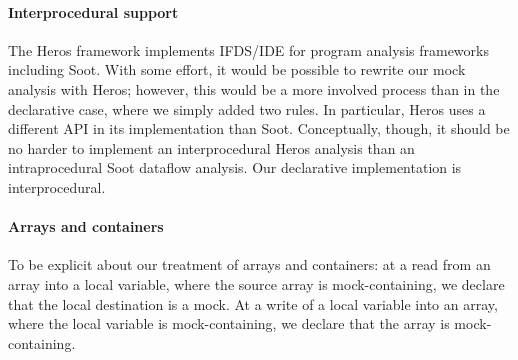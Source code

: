 

\paragraph{Interprocedural support} The Heros framework\cite{bodden12:_inter_proced_data_flow_analy} implements IFDS/IDE for program analysis frameworks including Soot. With some effort, it would be possible to rewrite our mock analysis with Heros; however, this would be a more involved process than in the declarative case, where we simply added two rules. In particular, Heros uses a different API in its implementation than Soot. Conceptually, though, it should be no harder to implement an interprocedural Heros analysis than an intraprocedural Soot dataflow analysis. Our declarative implementation is interprocedural.

\paragraph{Arrays and containers} To be explicit about our treatment of arrays and containers: at a read from an array into a local variable, where the source array is mock-containing, we declare that the local destination is a mock. At a write of a local variable into an array, where the local variable is mock-containing, we declare that the array is mock-containing.




